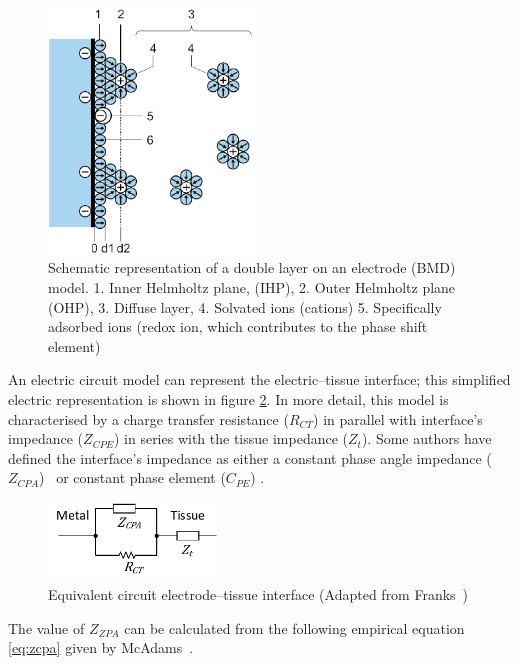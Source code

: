\begin{figure}[!htpb]
	\centering
	\includegraphics[width=5.5cm,keepaspectratio]{figure7}    
	\caption[Dual layer representation on an electrode]{Schematic representation of a double layer on an electrode (BMD) model. 1. Inner Helmholtz plane, (IHP), 2. Outer Helmholtz plane (OHP), 3. Diffuse layer, 4. Solvated ions (cations) 5. Specifically adsorbed ions (redox ion, which contributes to the phase shift element)}
	\label{fig:DLC}
\end{figure}


An electric circuit model can represent the electric–tissue interface; this simplified electric representation is shown in figure \ref{fig:e-t circuit}. In more detail, this model is characterised by a charge transfer resistance ($R_{CT}$) in parallel with interface’s impedance ($Z_{CPE}$) in series with the tissue impedance ($Z_t$).  Some authors have defined the interface’s impedance as either a constant phase angle impedance ($Z_{CPA}$)~\cite{franks2005impedance} or constant phase element ($C_{PE}$) \cite{barsoukov2005impedance,mcadams2006characterization}. 

\begin{figure}[!htpb]
	\centering
	\includegraphics[width=4.5cm,keepaspectratio]{figure8}    
	\caption[Equivalent circuit electrode–tissue interface]{Equivalent circuit electrode–tissue interface (Adapted from Franks~\cite{franks2005impedance})}
	\label{fig:e-t circuit}
\end{figure}

The value of $Z_{ZPA}$ can be calculated from the following empirical equation \ref{eq:zcpa} given by McAdams~\cite{mcadams1995linear}.

